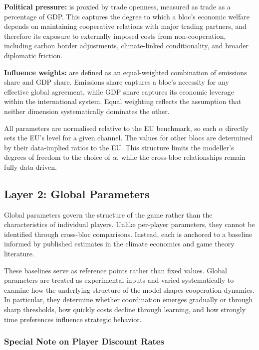 \documentclass[12pt,a4paper]{article}
\begin{document}
\textbf{Political pressure:} is proxied by trade openness, measured as trade as a percentage of GDP. This captures the degree to which a bloc's economic welfare depends on maintaining cooperative relations with major trading partners, and therefore its exposure to externally imposed costs from non-cooperation, including carbon border adjustments, climate-linked conditionality, and broader diplomatic friction.

\textbf{Influence weights:} are defined as an equal-weighted combination of emissions share and GDP share. Emissions share captures a bloc's necessity for any effective global agreement, while GDP share captures its economic leverage within the international system. Equal weighting reflects the assumption that neither dimension systematically dominates the other.

All parameters are normalised relative to the EU benchmark, so each $\alpha$ directly sets the EU's level for a given channel. The values for other blocs are determined by their data-implied ratios to the EU. This structure limits the modeller's degrees of freedom to the choice of $\alpha$, while the cross-bloc relationships remain fully data-driven.

\subsection{Layer 2: Global Parameters}

Global parameters govern the structure of the game rather than the characteristics of individual players. Unlike per-player parameters, they cannot be identified through cross-bloc comparisons. Instead, each is anchored to a baseline informed by published estimates in the climate economics and game theory literature.

These baselines serve as reference points rather than fixed values. Global parameters are treated as experimental inputs and varied systematically to examine how the underlying structure of the model shapes cooperation dynamics. In particular, they determine whether coordination emerges gradually or through sharp thresholds, how quickly costs decline through learning, and how strongly time preferences influence strategic behavior.

\subsubsection{Special Note on Player Discount Rates}
\end{document}

